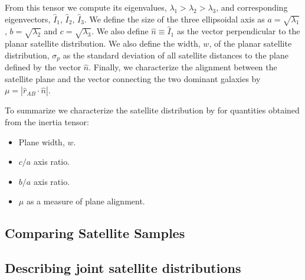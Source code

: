 \documentclass[a4paper,fleqn,usenatbib]{mnras}
\begin{document}
From this tensor we compute its eigenvalues,
$\lambda_1>\lambda_2>\lambda_3$, and corresponding eigenvectors,
$\hat{I}_1$, $\hat{I}_2$, $\hat{I}_3$.
We define the size of the three ellipsoidal axis as
$a=\sqrt{\lambda_1}$, $b=\sqrt{\lambda_2}$ and $c=\sqrt{\lambda_3}$.
We also define $\hat{n}\equiv \hat{I}_1$ as the vector perpendicular to the
planar satellite distribution. 
We also define the width, $w$, of the planar satellite distribution,
$\sigma_p$ as the standard deviation of all satellite distances to the
plane defined by the vector $\hat{n}$. 
Finally, we characterize the alignment between the satellite plane and the
vector connecting the two dominant galaxies by $\mu=|\hat{r}_{AB}\cdot
\hat{n}|$.

To summarize we characterize the satellite distribution by for
quantities obtained from the inertia tensor: 
\begin{itemize}
\item Plane width, $w$.
\item $c/a$ axis ratio.
\item $b/a$ axis ratio.
\item $\mu$ as a measure of plane alignment.
\end{itemize}



\subsection{Comparing Satellite Samples}

\subsection{Describing joint satellite distributions}



\end{document}
